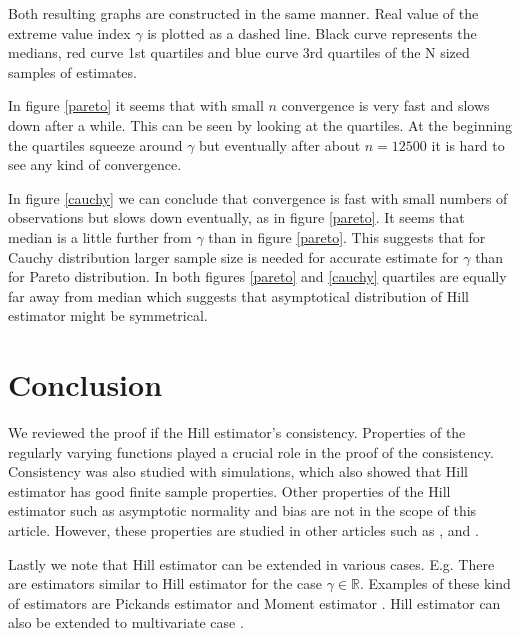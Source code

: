 \documentclass[english,12pt,a4paper,pdftex,sci,utf8]{aaltothesis} %
\begin{document}
Both resulting graphs are constructed in the same manner. Real value of the extreme value index $\gamma$  is plotted as a dashed line. Black curve represents the medians, red curve 1st quartiles and blue curve 3rd quartiles of the N sized samples of estimates.

In figure \ref{pareto} it seems that with small $n$ convergence is very fast and slows down after a while. This can be seen by looking at the quartiles. At the beginning the quartiles squeeze around $\gamma$ but eventually after about $n=12500$ it is hard to see any kind of convergence.

In figure \ref{cauchy} we can conclude that convergence is fast with small numbers of observations but slows down eventually, as in figure \ref{pareto}. It seems that median is a little further from $\gamma$ than in figure \ref{pareto}. This suggests that for Cauchy distribution larger sample size is needed for accurate estimate for $\gamma$ than for Pareto distribution. In both figures \ref{pareto} and \ref{cauchy} quartiles are equally far away from median which suggests that asymptotical distribution of Hill estimator might be symmetrical.


\clearpage
\section{Conclusion}
\label{conclusion}

We reviewed the proof if the Hill estimator's consistency. Properties of the regularly varying functions played a crucial role in the proof of the consistency. Consistency was also studied with simulations, which also showed that Hill estimator has good finite sample properties. Other properties of the Hill estimator such as asymptotic normality and bias are not in the scope of this article. However, these properties are studied in other articles such as \cite{peng}, \cite{hausler} and \cite{haanResnick}.

Lastly we note that  Hill estimator can be extended in various cases. E.g. There are estimators similar to Hill estimator  for the case $\gamma \in \mathbb{R}$. Examples of these kind of estimators are Pickands estimator \cite{pickands} and Moment estimator \cite{dekkers}. Hill estimator can also be extended to multivariate case \cite{ilmonen}.

\clearpage



{}


\end{document}
